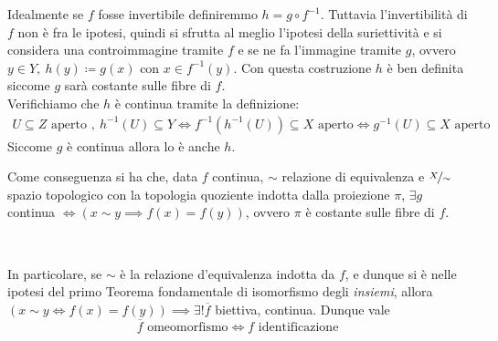\begin{demonstration}
	Idealmente se $f$ fosse invertibile definiremmo $h=g\circ f^{-1}$. Tuttavia l'invertibilità di $f$ non è fra le ipotesi, quindi si sfrutta al meglio l'ipotesi della suriettività e si considera una controimmagine tramite $f$ e se ne fa l'immagine tramite $g$, ovvero $y\in Y, \ h(y)\coloneqq g(x)$ con $x\in f^{-1}(y)$. Con questa costruzione $h$ è ben definita siccome $g$ sarà costante sulle fibre di $f$. \\
	Verifichiamo che $h$ è continua tramite la definizione:
		\begin{gather*}
			U\subseteq Z \text{ aperto }, \ h^{-1}(U)\subseteq Y \iff f^{-1}(h^{-1}(U))\subseteq X \text{ aperto} \iff g^{-1}(U)\subseteq X \text{ aperto}
		\end{gather*}
	Siccome $g$ è continua allora lo è anche $h$.
\end{demonstration}
\begin{minipage}[t]{0.83\textwidth} \label{proprietà identificazione quoziente e mappa continua indotta}
Come conseguenza si ha che, data $f$ continua, $\sim$ relazione di equivalenza e $\nicefrac{X}{\sim}$ spazio topologico con la topologia quoziente indotta dalla proiezione $\pi$, $\exists g$ continua $\iff \left( x\sim y \implies f(x)=f(y) \right)$, ovvero $\pi$ è costante sulle fibre di $f$.
\end{minipage}
\begin{minipage}[t]{0.16\textwidth}\vspace{-10pt}
	\end{minipage}\\
\hspace{-1mm}
\begin{minipage}[t]{0.83\textwidth}\vspace{2mm}
In particolare, se $\sim$ è la relazione d'equivalenza indotta da $f$, e dunque si è nelle ipotesi del primo Teorema fondamentale di isomorfismo degli \textit{insiemi}, allora $\left( x\sim y \iff f(x)=f(y) \right) \implies \exists ! \overline{f}$ biettiva, continua. Dunque vale
		\begin{equation}
				\overline{f} \text{ omeomorfismo} \iff f \text{ identificazione}
			\end{equation}
	 	\end{minipage}
